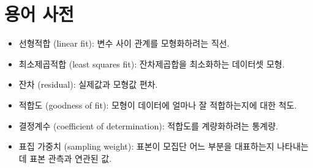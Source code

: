 \section{용어 사전}

\begin{itemize}

\item 선형적합 (linear fit): 변수 사이 관계를 모형화하려는 직선.

\item 최소제곱적합 (least squares fit): 잔차제곱합을 최소화하는 데이터셋 모형.

\item 잔차 (residual): 실제값과 모형값 편차.

\item 적합도 (goodness of fit): 모형이 데이터에 얼마나 잘 적합하는지에 대한 척도.

\item 결정계수 (coefficient of determination): 적합도를 계량화하려는 통계량.

\item 표집 가중치 (sampling weight): 
표본이 모집단 어느 부분을 대표하는지 나타내는데 표본 관측과 연관된 값.

\end{itemize}

